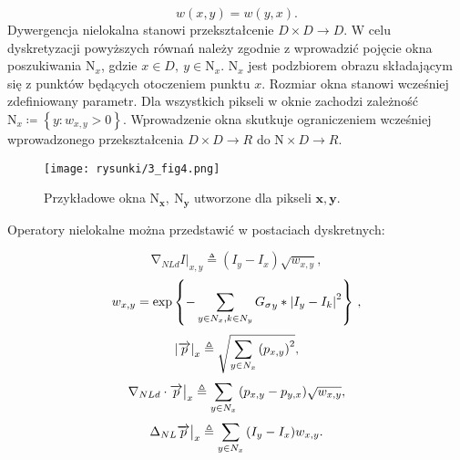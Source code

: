 \documentclass[12pt, twoside, openany]{report}
\theoremstyle{definition}
\begin{document}
\begin{equation}
w(x,y) = w(y,x)
\label{SMARTWEIGHT}
.
\end{equation}
Dywergencja nielokalna stanowi przekształcenie $D \times D \longrightarrow D$.
W celu dyskretyzacji powyższych równań należy zgodnie z \cite{gilboa2008nonlocal} wprowadzić pojęcie okna poszukiwania ${\mathrm{N}}_x$, gdzie $x\in D,\ y\in {\mathrm{N}}_x$. ${\mathrm{N}}_x$ jest podzbiorem obrazu składającym się z punktów będących otoczeniem punktu $x$. Rozmiar okna stanowi wcześniej zdefiniowany parametr. Dla wszystkich pikseli w oknie zachodzi zależność ${\mathrm{N}}_x\coloneqq \left\{y:w_{x,y}>0\right\}$. Wprowadzenie okna skutkuje ograniczeniem wcześniej wprowadzonego przekształcenia $D \times D\longrightarrow R$ do $\mathrm{N} \times D\longrightarrow R$.
\begin{figure}[!h]
	\centering
	\texttt{[image: rysunki/3\_fig4.png]}
	\caption{Przykładowe okna ${\boldsymbol{\mathrm{N}}}_{\boldsymbol{x}}\boldsymbol{,\ }{\boldsymbol{\mathrm{N}}}_{\boldsymbol{y}}$ utworzone dla pikseli $\boldsymbol{x},\boldsymbol{y}$.}
	\label{3_fig4}
\end{figure}
Operatory nielokalne można przedstawić w postaciach dyskretnych:
\begin{large}
\begin{equation}
{\mathrm{\nabla }}_{NLd}I|_{x,y}\triangleq \left(I_y-I_x\right)\sqrt{w_{x,y}}
\label{DNLGRAD}
,
\end{equation}
\begin{equation}
w_{x,y}={\mathrm{exp} \left\{-\sum_{y\in N_x,k\in N_y \\
}{{G_{\sigma}}_y \ast {\left|I_y-I_k\right|}^2}\right\}\ }
\label{DNLWEIGHT}
,
\end{equation}
\begin{equation}
{\left|\overrightarrow{p}\right|}_x\triangleq \sqrt{\sum_{y\in N_x \\ 
}{{\left(p_{x,y}\right)}^2}}
\label{DNLMAG}
,
\end{equation}
\begin{equation}
{\mathrm{\nabla }}_{NLd}\cdot \overrightarrow{p}\big|_x \triangleq \sum_{ 
y\in N_x \\ 
}{\left(p_{x,y}-p_{y,x}\right)}\sqrt{w_{x,y}}
\label{DNLDIV}
,
\end{equation}
\begin{equation}
{\mathrm{\Delta }}_{NL}{\overrightarrow{p}}\big|_x \triangleq \sum_{
y\in N_x \\ 
}{\left(I_y-I_x\right)}w_{x,y}
\label{DNLLAP}
.
\end{equation}
\end{large}
\end{document}
